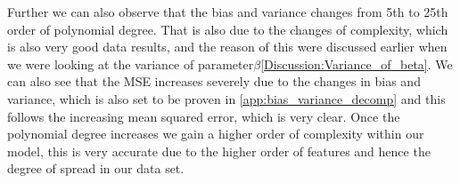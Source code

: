\documentclass[../main.tex]{subfiles}
\begin{document}
\begin{flushleft}
 Further we can also observe that the bias and variance changes from 5th to 25th order of polynomial degree. That is also due to the changes of complexity, which is also very good data results, and the reason of this were discussed earlier when we were looking at the variance of
 parameter$\beta$\ref{Discussion:Variance_of_beta}. We can also see that the MSE increases severely due to the changes in bias and variance, which is also set to be proven in \eqref{app:bias_variance_decomp} and this follows the increasing mean squared error, which is very clear. Once the polynomial degree increases we gain a higher order of complexity within our model, this is very accurate due to the higher order of features and hence the degree of spread in our data set.
\end{flushleft}

\newpage
\end{document}
